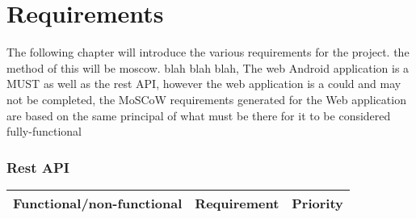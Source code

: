 \section{Requirements}
The following chapter will introduce the various requirements for the project. the method of this will be moscow. blah blah blah, The web Android application is a MUST as well as the rest API, however the web application is a could and may not be completed, the MoSCoW requirements generated for the Web application are based on the same principal of what must be there for it to be considered fully-functional

\subsubsection{Rest API}
{\renewcommand{\arraystretch}{1.5}%
	\begin{tabular}{| p{} | p{} | p{}|}
		\hline
		Functional/non-functional & Requirement & Priority\\\hline
	\end{tabular}
}

